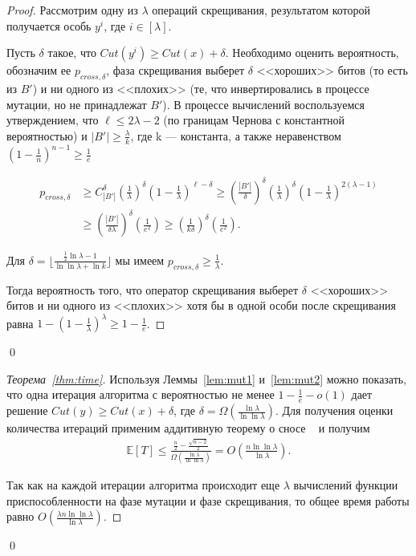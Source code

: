 \documentclass[times]{itmo-student-thesis}
\renewcommand{\binom}[2]{\mbox{$C^{#2}_{#1}$}}
\begin{document}
\begin{proof}
Рассмотрим одну из $\lambda$ операций скрещивания, результатом которой получается особь $y^i$, где $i \in [\lambda]$.

Пусть $\delta$ такое, что $Cut(y^i) \ge Cut(x) + \delta$.
Необходимо оценить вероятность, обозначим ее $p_{cross,\delta}$, фаза скрещивания выберет $\delta$ <<хороших>> битов (то есть из $B'$) и ни одного из <<плохих>> (те, что инвертировались в процессе мутации, но не принадлежат $B'$).
В процессе вычислений воспользуемся утверждением, что $\ell \le 2\lambda - 2$ (по границам Чернова с константной вероятностью) и $|B'| \ge \frac{\lambda}{k}$, где k --- константа, а также неравенством $(1 - \frac{1}{n})^{n-1} \ge \frac{1}{e}$

\begin{align*}
p_{cross,\delta}
&\ge
    \binom{|B'|}{\delta}   \left(\frac{1}{\lambda}\right)^{\delta}\left(1 -\frac{1}{\lambda}\right)^{\ell - \delta}
\ge
    \left(\frac{|B'|}{\delta}\right)^{\delta}\left(\frac{1}{\lambda}\right)^{\delta}\left(1 -\frac{1}{\lambda}\right)^{2(\lambda -1)} \\
&\ge
    \left(\frac{|B'|}{\delta\lambda}\right)^{\delta}\left(\frac{1}{e^2}\right)
\ge \left(\frac{1}{k\delta}\right)^{\delta}\left(\frac{1}{e^2}\right).
\end{align*}

Для $\delta = \lfloor\frac{\frac{1}{2}\ln \lambda - 1}{\ln\ln \lambda + \ln k} \rfloor$ мы имеем $p_{cross,\delta} \ge \frac{1}{\lambda}$.

Тогда вероятность того, что оператор скрещивания выберет $\delta$ <<хороших>> битов и ни одного из <<плохих>> хотя бы в одной особи после скрещивания равна $1 - (1 - \frac{1}{\lambda})^{\lambda} \ge 1 - \frac{1}{e}$.
\end{proof}\qed

\begin{proof}[Теорема~\ref{thm:time}]
Используя Леммы~\ref{lem:mut1} и~\ref{lem:mut2} можно показать, что одна итерация алгоритма с вероятностью не менее $1 - \frac{1}{e} - o(1)$ дает решение $Cut(y) \ge Cut(x) + \delta$, где $\delta = \Omega(\frac{\ln \lambda}{\ln \ln \lambda})$.
Для получения оценки количества итераций применим аддитивную теорему о сносе ~\cite{He00driftanalysis} и получим
\begin{align*}
  \mathbb{E}[T] \le \frac{\frac{n}{2} - \frac{\sqrt{n-2}}{2}}{\Omega(\frac{\ln \lambda}{\ln \ln \lambda})} = O\left(\frac{n\ln \ln \lambda}{\ln \lambda}\right).
\end{align*}

Так как на каждой итерации алгоритма происходит еще $\lambda$  вычислений функции приспособленности на фазе мутации и фазе скрещивания, то общее время работы равно $O\left(\frac{\lambda n\ln \ln \lambda}{\ln \lambda}\right)$.
\end{proof}\qed
\end{document}

